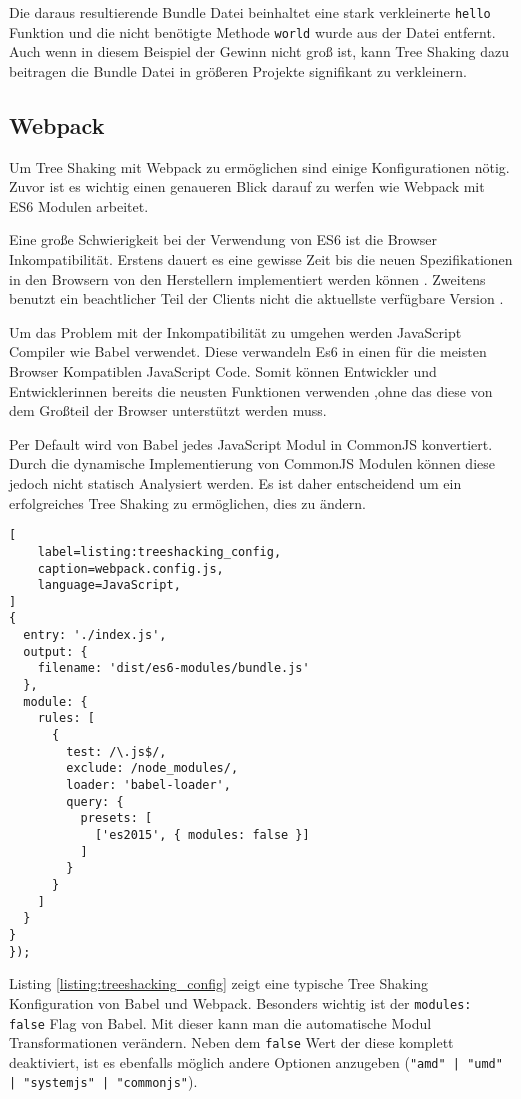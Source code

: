 Die daraus resultierende Bundle Datei beinhaltet eine stark verkleinerte \lstinline{hello} Funktion und die nicht benötigte Methode \lstinline{world} wurde aus der Datei entfernt. Auch wenn in diesem Beispiel der Gewinn nicht groß ist, kann Tree Shaking dazu beitragen die Bundle Datei in größeren Projekte signifikant zu verkleinern.
\autocite{WebpackTreeShaking}

\subsection{Webpack}

Um Tree Shaking mit Webpack zu ermöglichen sind einige Konfigurationen nötig. 
Zuvor ist es wichtig einen genaueren Blick darauf zu werfen wie Webpack mit ES6 Modulen arbeitet.

Eine große Schwierigkeit bei der Verwendung von ES6 ist die Browser Inkompatibilität. Erstens dauert es eine gewisse Zeit bis die neuen Spezifikationen in den Browsern von den Herstellern implementiert werden können \autocite{CanIUseES6}. Zweitens benutzt ein beachtlicher Teil der Clients nicht die aktuellste verfügbare Version \autocite{CanIUseUsageTable}.

Um das Problem mit der Inkompatibilität zu umgehen werden JavaScript Compiler wie Babel verwendet. Diese verwandeln Es6 in einen für die meisten Browser Kompatiblen JavaScript Code. Somit können Entwickler und Entwicklerinnen bereits die neusten Funktionen verwenden ,ohne das diese von dem Großteil der Browser unterstützt werden muss.\autocite{Babel}

Per Default wird von Babel jedes JavaScript Modul in CommonJS konvertiert. Durch die dynamische Implementierung von CommonJS Modulen können diese jedoch nicht statisch Analysiert werden. Es ist daher entscheidend um ein erfolgreiches Tree Shaking zu ermöglichen, dies zu ändern.\autocite{Babel}

\begin{lstlisting}[
    label=listing:treeshacking_config,
	caption=webpack.config.js,
	language=JavaScript,
]
{
  entry: './index.js',
  output: {
    filename: 'dist/es6-modules/bundle.js'
  },
  module: {
    rules: [
      {
        test: /\.js$/,
        exclude: /node_modules/,
        loader: 'babel-loader',
        query: {
          presets: [
            ['es2015', { modules: false }]
          ]
        }
      }
    ]
  }
}
});
\end{lstlisting}

Listing \ref{listing:treeshacking_config} zeigt eine typische Tree Shaking Konfiguration von Babel und Webpack. Besonders wichtig ist der \lstinline{modules: false} Flag von Babel. Mit dieser kann man die automatische Modul Transformationen verändern. Neben dem \lstinline{false} Wert der diese komplett deaktiviert, ist es ebenfalls möglich andere Optionen anzugeben (\lstinline{"amd" | "umd" | "systemjs" | "commonjs"}). \autocite{Babel}

